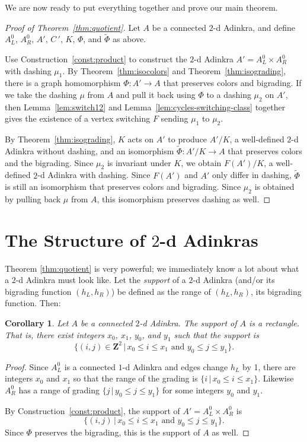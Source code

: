 \documentclass[12pt,twoside,singlespace]{article}
\numberwithin{equation}{section}
\newtheorem{cor}[equation]{Corollary}
\theoremstyle{definition}
\newcommand{\ZZ}{\mathbf{Z}}
\begin{document}
We are now ready to put everything together and prove our main theorem.

\begin{proof}[Proof of Theorem~\ref{thm:quotient}]
Let $A$ be a connected $2$-d Adinkra, and define $A_L^0$, $A_R^0$, $A'$, $C\,'$, $K$, $\Phi$, and $\tilde{\Phi}$ as above.

Use Construction~\ref{const:product} to construct the $2$-d Adinkra $A'=A_L^0\times A_R^0$ with dashing $\mu_1$.
By Theorem~\ref{thm:isocolors} and Theorem~\ref{thm:isograding}, there is a graph homomorphism $\Phi:A' \to A$ that preserves colors and bigrading.  If we take the dashing $\mu$ from $A$ and pull it back using $\Phi$ to a dashing $\mu_2$ on $A'$, then Lemma~\ref{lem:switch12} and Lemma~\ref{lem:cycles-switching-class} together gives the existence of a vertex switching $F$ sending $\mu_1$ to $\mu_2$.

By Theorem~\ref{thm:isograding}, $K$ acts on $A'$ to produce $A'/K$, a well-defined $2$-d Adinkra without dashing, and an isomorphism $\tilde{\Phi}:A'/K\to A$ that preserves colors and the bigrading.  Since $\mu_2$ is invariant under $K$, we obtain  $F(A')/K$, a well-defined $2$-d Adinkra with dashing. Since $F(A')$ and $A'$ only differ in dashing, $\tilde{\Phi}$ is still an isomorphism that preserves colors and bigrading.  Since $\mu_2$ is obtained by pulling back $\mu$ from $A$, this isomorphism preserves dashing as well.
\end{proof}

\section{The Structure of $2$-d Adinkras}
\label{sec:structure}
Theorem \ref{thm:quotient} is very powerful; we immediately know a lot about what a $2$-d Adinkra must look like. Let the \emph{support} of a $2$-d Adinkra (and/or its bigrading function $(h_L,h_R)$) be defined as the range of $(h_L,h_R)$, its bigrading function. Then:
\begin{cor}
\label{cor:rectangle}
Let $A$ be a connected $2$-d Adinkra.  The support of $A$ is a rectangle.  That is, there exist integers $x_0$, $x_1$, $y_0$, and $y_1$ such that the support is
\[\{(i,j)\in\ZZ^2\,|\,x_0 \le i\le x_1\mbox{ and }y_0\le j\le y_1\}.\]
\end{cor}
\begin{proof}
Since $A_L^0$ is a connected $1$-d Adinkra and edges change $h_L$ by 1, there are integers $x_0$ and $x_1$ so that the range of the grading is $\{i\,|\,x_0\le i\le x_1\}$.  Likewise $A_R^0$ has a range of grading $\{j\,|\,y_0\le j\le y_1\}$ for some integers $y_0$ and $y_1$.

By Construction~\ref{const:product}, the support of $A'=A_L^0\times A_R^0$ is
\[\{(i,j)\,|\,x_0\le i\le x_1\mbox{ and }y_0\le j\le y_1\}.\]
Since $\Phi$ preserves the bigrading, this is the support of $A$ as well.
\end{proof}
\end{document}
